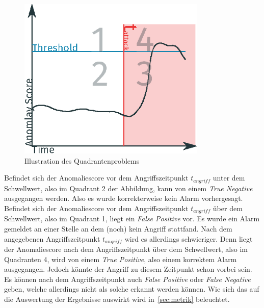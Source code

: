                     \begin{figure}[ht]
                        \centering
                        \includegraphics[width=0.8\textwidth]{images/q_problem.eps}
                        \caption{Illustration des Quadrantenproblems}
                        \label{fig:quadrant}
                    \end{figure}

                    Befindet sich der Anomaliescore vor dem Angriffszeitpunkt $t_{angriff}$ unter dem Schwellwert, also im Quadrant 2 der Abbildung, kann von einem \textit{True Negative} ausgegangen werden.
                    Also es wurde korrekterweise kein Alarm vorhergesagt.
                    Befindet sich der Anomaliescore vor dem Angriffszeitpunkt $t_{angriff}$ über dem Schwellwert, also im Quadrant 1, liegt ein \textit{False Positive} vor.
                    Es wurde ein Alarm gemeldet an einer Stelle an dem (noch) kein Angriff stattfand.
                    Nach dem angegebenen Angriffszeitpunkt $t_{angriff}$ wird es allerdings schwieriger.
                    Denn liegt der Anomaliescore nach dem Angriffszeitpunkt über dem Schwellwert, also im Quadranten 4, wird von einem \textit{True Positive}, also einem korrektem Alarm ausgegangen.
                    Jedoch könnte der Angriff zu diesem Zeitpunkt schon vorbei sein.
                    Es können nach dem Angriffszeitpunkt auch \textit{False Positive} oder \textit{False Negative} geben, welche allerdings nicht als solche erkannt werden können.
                    Wie sich das auf die Auswertung der Ergebnisse auswirkt wird in~\autoref{sec:metrik} beleuchtet.

